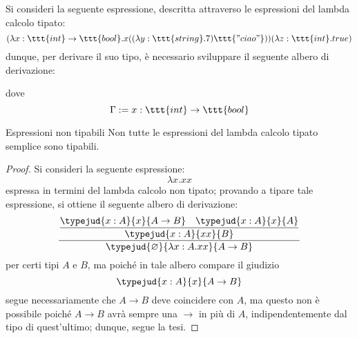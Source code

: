 \documentclass[a4paper, 12pt]{report}
\begin{document}
    \begin{example}
        Si consideri la seguente espressione, descritta attraverso le espressioni del lambda calcolo tipato: $$(\lambda x:\ttt{int}\to \ttt{bool}.x((\lambda y:\ttt{string}.7)\ttt{"ciao"}))(\lambda z: \ttt{int}.true)$$ dunque, per derivare il suo tipo, è necessario sviluppare il seguente albero di derivazione: 

        dove $$\Gamma := x: \ttt{int} \to \ttt{bool}$$
    \end{example}

    \begin{framedlem}[label={lambda type non type}]{Espressioni non tipabili}
        Non tutte le espressioni del lambda calcolo tipato semplice sono tipabili.
    \end{framedlem}

    \begin{proof}
        Si consideri la seguente espressione: $$\lambda x. xx$$ espressa in termini del lambda calcolo non tipato; provando a tipare tale espressione, si ottiene il seguente albero di derivazione: $$\dfrac{\dfrac{\typejud{x:A}{x}{A \to B} \quad \typejud{x:A}{x}{A}}{\typejud{x:A}{xx}{B}}}{\typejud{\varnothing}{\lambda x: A .xx}{A \to B}}$$ per certi tipi $A$ e $B$, ma poiché in tale albero compare il giudizio $$\typejud{x:A}{x}{A \to B}$$ segue necessariamente che $A \to B$ deve coincidere con $A$, ma questo non è possibile poiché $A \to B$ avrà sempre una $\to$ in più di $A$, indipendentemente dal tipo di quest'ultimo; dunque, segue la tesi.
    \end{proof}
\end{document}
